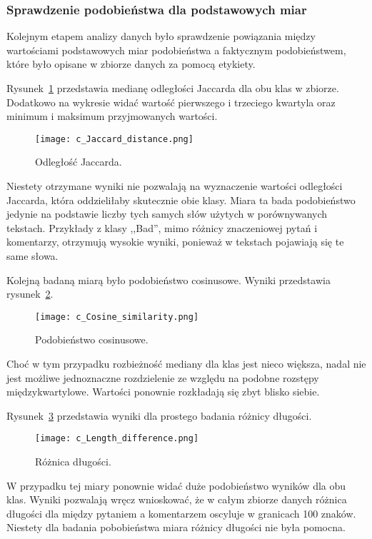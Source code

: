 \subsubsection{Sprawdzenie podobieństwa dla podstawowych miar}

Kolejnym etapem analizy danych było sprawdzenie powiązania między wartościami podstawowych miar podobieństwa a faktycznym podobieństwem, które było opisane w zbiorze danych za pomocą etykiety.

Rysunek~\ref{c_jaccard_distance} przedstawia medianę odległości Jaccarda dla obu klas w zbiorze. Dodatkowo na wykresie widać wartość pierwszego i trzeciego kwartyla oraz minimum i maksimum przyjmowanych wartości.

\begin{figure}[H]
\centering
\texttt{[image: c\_Jaccard\_distance.png]}
\caption{Odległość Jaccarda.}
\label{c_jaccard_distance}
\end{figure}

Niestety otrzymane wyniki nie pozwalają na wyznaczenie wartości odległości Jaccarda, która oddzieliłaby skutecznie obie klasy. Miara ta bada podobieństwo jedynie na podstawie liczby tych samych słów użytych w porównywanych tekstach. Przykłady z klasy ,,Bad'', mimo różnicy znaczeniowej pytań i komentarzy, otrzymują wysokie wyniki, ponieważ w tekstach pojawiają się te same słowa.

Kolejną badaną miarą było podobieństwo cosinusowe. Wyniki przedstawia rysunek~\ref{c_cosine_similarity}.

\begin{figure}[H]
\centering
\texttt{[image: c\_Cosine\_similarity.png]}
\caption{Podobieństwo cosinusowe.}
\label{c_cosine_similarity}
\end{figure}

Choć w tym przypadku rozbieżność mediany dla klas jest nieco większa, nadal nie jest możliwe jednoznaczne rozdzielenie ze względu na podobne rozstępy międzykwartylowe. Wartości ponownie rozkładają się zbyt blisko siebie.

Rysunek~\ref{c_length_difference} przedstawia wyniki dla prostego badania różnicy długości.

\begin{figure}[H]
\centering
\texttt{[image: c\_Length\_difference.png]}
\caption{Różnica długości.}
\label{c_length_difference}
\end{figure}

W przypadku tej miary ponownie widać duże podobieństwo wyników dla obu klas. Wyniki pozwalają wręcz wnioskować, że w całym zbiorze danych różnica długości dla między pytaniem a komentarzem oscyluje w granicach 100 znaków. Niestety dla badania pobobieństwa miara różnicy długości nie była pomocna.

